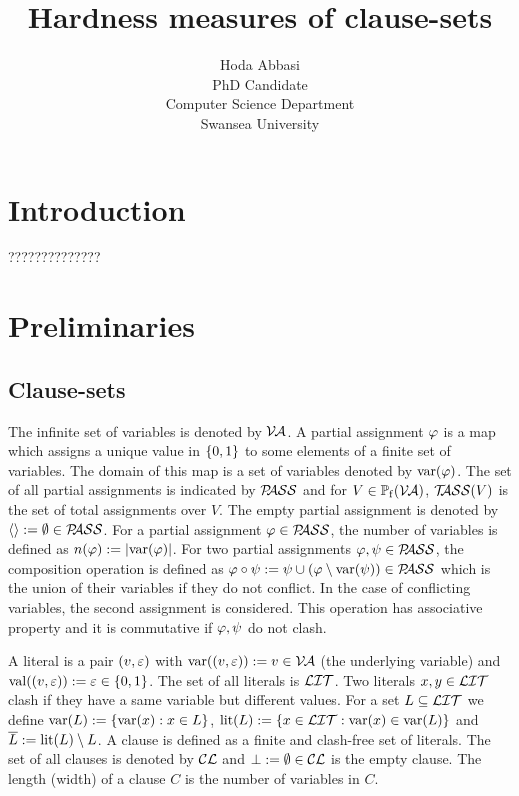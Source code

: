 \documentclass[]{book}
\begin{document}
\title{Hardness measures of clause-sets}

\author{Hoda Abbasi\\
        PhD Candidate\\
        Computer Science Department\\
        Swansea University\\}
\maketitle

\tableofcontents
\chapter{Introduction}
\label{cha:Introduction}

??????????????
\chapter{Preliminaries}
\label{cha:Preliminaries}

\section{Clause-sets}
\label{sec:Clause-sets}

The infinite set of variables is denoted by $\mathcal{V\hspace{-0.1em}A}$. A partial assignment $\varphi$ is a map which assigns a unique value in $\{ 0,1 \}$ to some elements of a finite set of variables. The domain of this map is a set of variables denoted by $\operatorname{var}(\varphi)$. The set of all partial assignments is indicated by $\mathcal{P\hspace{-0.32em}ASS}$ and for $V \in \operatorname{\mathbb{P}_f}(\mathcal{V\hspace{-0.1em}A})$, $\mathcal{T\hspace{-0.35em}ASS}(V)$ is the set of total assignments over $V$. The empty partial assignment is denoted by $\langle  \rangle:= \emptyset \in \mathcal{P\hspace{-0.32em}ASS}$. For a partial assignment $\varphi \in \mathcal{P\hspace{-0.32em}ASS}$, the number of variables is defined as $n(\varphi):=\lvert \operatorname{var}(\varphi) \rvert$. For two partial assignments $\varphi, \psi \in \mathcal{P\hspace{-0.32em}ASS}$, the composition operation is defined as $\varphi \circ \psi := \psi \cup (\varphi \setminus \operatorname{var}(\psi)) \in \mathcal{P\hspace{-0.32em}ASS}$ which is the union of their variables if they do not conflict. In the case of conflicting variables, the second assignment is considered. This operation has associative property and it is commutative if $\varphi, \psi$ do not clash.

A literal is a pair $(v,\varepsilon)$ with $\operatorname{var}((v,\varepsilon)):=v \in \mathcal{V\hspace{-0.1em}A}$ (the underlying variable) and $\operatorname{val}((v,\varepsilon)):=\varepsilon \in \{ 0,1 \}$. The set of all literals is $\mathcal{LIT}$. Two literals $x, y \in \mathcal{LIT}$ clash if they have a same variable but different values. For a set $L \subseteq \mathcal{LIT}$ we define $\operatorname{var}(L) := \{ \operatorname{var}(x) : x \in L \}$, $\operatorname{lit}(L):= \{ x \in \mathcal{LIT} : \operatorname{var}(x) \in \operatorname{var}(L) \}$ and $\overline{L} := \operatorname{lit}(L) \setminus L$. A clause is defined as a finite and clash-free set of literals. The set of all clauses is denoted by $\mathcal{CL}$ and $\bot := \emptyset \in \mathcal{CL}$ is the empty clause. The length (width) of a clause $C$ is the number of variables in $C$.
\end{document}
